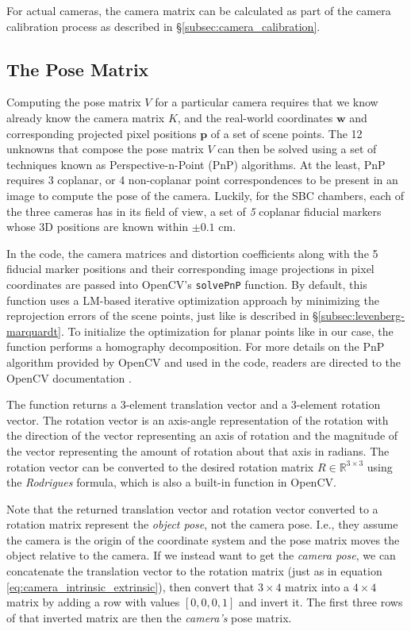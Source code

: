 \documentclass[11pt, letterpaper]{extarticle} %
\begin{document}
For actual cameras, the camera matrix can be calculated as part of the camera calibration process as described in \S\ref{subsec:camera_calibration}.

\subsection{The Pose Matrix} \label{subsec:the_pose_matrix}
Computing the pose matrix $V$ for a particular camera requires that we know already know the camera matrix $K$, and the real-world coordinates $\mathbf{w}$ and corresponding projected pixel positions $\mathbf{p}$ of a set of scene points. The 12 unknowns that compose the pose matrix $V$ can then be solved using a set of techniques known as Perspective-n-Point (PnP) algorithms. At the least, PnP requires 3 coplanar, or 4 non-coplanar point correspondences to be present in an image to compute the pose of the camera. Luckily, for the SBC chambers, each of the three cameras has in its field of view, a set of \textit{5} coplanar fiducial markers whose 3D positions are known within $\pm 0.1$ cm. 

In the code, the camera matrices and distortion coefficients along with the 5 fiducial marker positions and their corresponding image projections in pixel coordinates are passed into OpenCV's \verb|solvePnP| function. By default, this function uses a LM-based iterative optimization approach by minimizing the reprojection errors of the scene points, just like is described in \S\ref{subsec:levenberg-marquardt}. To initialize the optimization for planar points like in our case, the function performs a homography decomposition. For more details on the PnP algorithm provided by OpenCV and used in the code, readers are directed to the OpenCV documentation \cite{opencv_library}. 

The function returns a 3-element translation vector and a 3-element rotation vector. The rotation vector is an axis-angle representation of the rotation with the direction of the vector representing an axis of rotation and the magnitude of the vector representing the amount of rotation about that axis in radians. The rotation vector can be converted to the desired rotation matrix $R \in \mathbb{R}^{3 \times 3}$ using the \textit{Rodrigues} formula, which is also a built-in function in OpenCV. 

Note that the returned translation vector and rotation vector converted to a rotation matrix represent the \textit{object pose}, not the camera pose. I.e., they assume the camera is the origin of the coordinate system and the pose matrix moves the object relative to the camera. If we instead want to get the \textit{camera pose}, we can concatenate the translation vector to the rotation matrix (just as in equation \ref{eq:camera_intrinsic_extrinsic}), then convert that $3 \times 4$ matrix into a $4 \times 4$ matrix by adding a row with values $[0, 0, 0, 1]$ and invert it. The first three rows of that inverted matrix are then the \textit{camera's} pose matrix.
\end{document}
